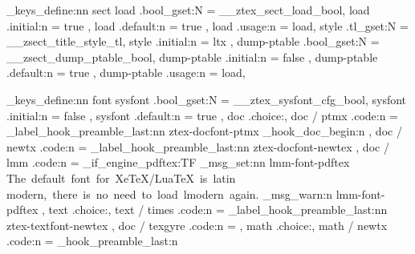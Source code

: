 \ztex_keys_define:nn { sect }{
  load          .bool_gset:N  = \g__ztex_sect_load_bool,
  load          .initial:n    = { true },
  load          .default:n    = { true },
  load          .usage:n      = load,
  style         .tl_gset:N    = \g__zsect_title_style_tl,
  style         .initial:n    = { ltx },
  dump-ptable   .bool_gset:N  = \g__zsect_dump_ptable_bool,
  dump-ptable   .initial:n    = { false },
  dump-ptable   .default:n    = { true },
  dump-ptable   .usage:n      = load,
}


\ztex_keys_define:nn { font }{
  sysfont         .bool_gset:N  = \g__ztex_sysfont_cfg_bool,
  sysfont         .initial:n    = { false },
  sysfont         .default:n    = { true },
  doc             .choice:,
  doc / ptmx      .code:n       = {
    \ztex_label_hook_preamble_last:nn
      { ztex-docfont-ptmx }
      {
        \RequirePackage{mathptmx}
        \RequirePackage{newtxtext}
      }
    \ztex_hook_doc_begin:n
      {
        \let\pi\new@pi
        \let\jmath\new@jmath
        \let\amalg\new@amalg
        \let\coprod\new@coprod
      }
  },
  doc / newtx    .code:n       = {
    \ztex_label_hook_preamble_last:nn
      { ztex-docfont-newtex }
      {
        \RequirePackage{newtxtext}
        \RequirePackage{newtxmath}
      }
  },
  doc / lmm       .code:n      = {
    \sys_if_engine_pdftex:TF 
      { 
        \RequirePackage{lmodern}
        \RequirePackage{fixcmex} 
      }{ 
        \ztex_msg_set:nn {lmm-font-pdftex}
          {
            The~default~font~for~XeTeX/LuaTeX~is~latin~
            modern,~there~is~no~need~to~load~lmodern~again.
          }
        \ztex_msg_warn:n {lmm-font-pdftex} 
      }
  },
  text            .choice:,
  text / times    .code:n       = {
    \ztex_label_hook_preamble_last:nn
      { ztex-textfont-newtex }
      {
        \RequirePackage{newtxtext}
      }
  },
  doc / texgyre   .code:n       = {  },  %
  math            .choice:,
  math / newtx    .code:n       = {
    \ztex_hook_preamble_last:n 
      { 
        \RequirePackage{newtxmath}
      } 
}}
